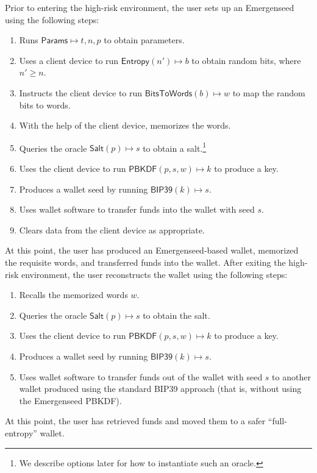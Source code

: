 \documentclass{article}
\begin{document}
Prior to entering the high-risk environment, the user sets up an Emergenseed using the following steps:
\begin{enumerate}
	\item Runs $\mathsf{Params} \mapsto t, n, p$ to obtain parameters.
	\item Uses a client device to run $\mathsf{Entropy}(n') \mapsto b$ to obtain random bits, where $n' \geq n$.
	\item Instructs the client device to run $\mathsf{BitsToWords}(b) \mapsto w$ to map the random bits to words.
	\item With the help of the client device, memorizes the words.
	\item Queries the oracle $\mathsf{Salt}(p) \mapsto s$ to obtain a salt.\footnote{We describe options later for how to instantiate such an oracle.}
	\item Uses the client device to run $\mathsf{PBKDF}(p, s, w) \mapsto k$ to produce a key.
	\item Produces a wallet seed by running $\mathsf{BIP39}(k) \mapsto s$.
	\item Uses wallet software to transfer funds into the wallet with seed $s$.
	\item Clears data from the client device as appropriate.
\end{enumerate}

At this point, the user has produced an Emergenseed-based wallet, memorized the requisite words, and transferred funds into the wallet.
After exiting the high-risk environment, the user reconstructs the wallet using the following steps:
\begin{enumerate}
	\item Recalls the memorized words $w$.
	\item Queries the oracle $\mathsf{Salt}(p) \mapsto s$ to obtain the salt.
	\item Uses the client device to run $\mathsf{PBKDF}(p, s, w) \mapsto k$ to produce a key.
	\item Produces a wallet seed by running $\mathsf{BIP39}(k) \mapsto s$.
	\item Uses wallet software to transfer funds out of the wallet with seed $s$ to another wallet produced using the standard BIP39 approach (that is, without using the Emergenseed PBKDF).
\end{enumerate}

At this point, the user has retrieved funds and moved them to a safer ``full-entropy'' wallet.
\end{document}
